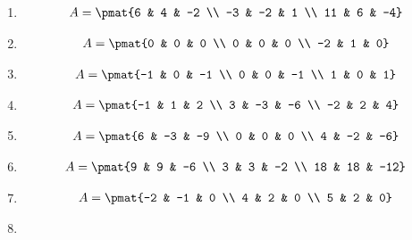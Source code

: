\begin{enumerate}
\item

\begin{align*}
A = \pmat{6 & 4 & -2 \\ -3 & -2 & 1 \\ 11 & 6 & -4}
\end{align*}

\item

\begin{align*}
A = \pmat{0 & 0 & 0 \\ 0 & 0 & 0 \\ -2 & 1 & 0}
\end{align*}

\item

\begin{align*}
A = \pmat{-1 & 0 & -1 \\ 0 & 0 & -1 \\ 1 & 0 & 1}
\end{align*}

\item

\begin{align*}
A = \pmat{-1 & 1 & 2 \\ 3 & -3 & -6 \\ -2 & 2 & 4}
\end{align*}

\item

\begin{align*}
A = \pmat{6 & -3 & -9 \\ 0 & 0 & 0 \\ 4 & -2 & -6}
\end{align*}

\item

\begin{align*}
A = \pmat{9 & 9 & -6 \\ 3 & 3 & -2 \\ 18 & 18 & -12}
\end{align*}

\item

\begin{align*}
A = \pmat{-2 & -1 & 0 \\ 4 & 2 & 0 \\ 5 & 2 & 0}
\end{align*}

\item


\end{enumerate}
